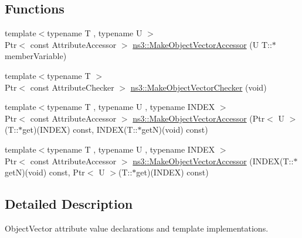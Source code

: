 \subsection*{Functions}
\begin{DoxyCompactItemize}
\item 
{\footnotesize template$<$typename T , typename U $>$ }\\Ptr$<$ const Attribute\+Accessor $>$ \hyperlink{namespacens3_a6ad5b3621a5dc72b7030cbb07c73adf6}{ns3\+::\+Make\+Object\+Vector\+Accessor} (U T\+::$\ast$member\+Variable)
\item 
{\footnotesize template$<$typename T $>$ }\\Ptr$<$ const Attribute\+Checker $>$ \hyperlink{namespacens3_aa3903ab452263592a566f303b00bb41b}{ns3\+::\+Make\+Object\+Vector\+Checker} (void)
\item 
{\footnotesize template$<$typename T , typename U , typename I\+N\+D\+EX $>$ }\\Ptr$<$ const Attribute\+Accessor $>$ \hyperlink{namespacens3_a09a4ebc97ad31769e5575b2fd797cde5}{ns3\+::\+Make\+Object\+Vector\+Accessor} (Ptr$<$ U $>$(T\+::$\ast$get)(I\+N\+D\+EX) const, I\+N\+D\+EX(T\+::$\ast$getN)(void) const)
\item 
{\footnotesize template$<$typename T , typename U , typename I\+N\+D\+EX $>$ }\\Ptr$<$ const Attribute\+Accessor $>$ \hyperlink{namespacens3_aa503a7441373fc35d454516f7947ebe2}{ns3\+::\+Make\+Object\+Vector\+Accessor} (I\+N\+D\+EX(T\+::$\ast$getN)(void) const, Ptr$<$ U $>$(T\+::$\ast$get)(I\+N\+D\+EX) const)
\end{DoxyCompactItemize}


\subsection{Detailed Description}
Object\+Vector attribute value declarations and template implementations. 